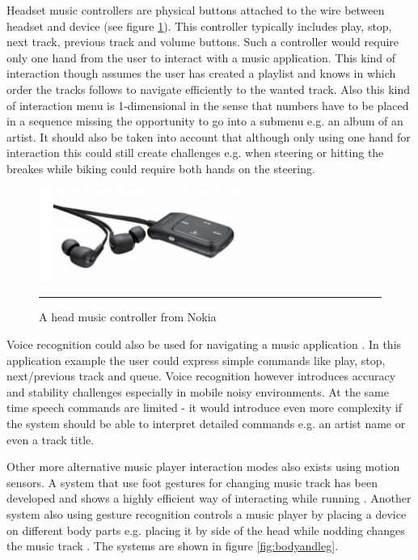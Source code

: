 Headset music controllers are physical buttons attached to the wire between headset and device (see figure \ref{fig:nokia}). This controller typically includes play, stop, next track, previous track and volume buttons. Such a controller would require only one hand from the user to interact with a music application. This kind of interaction though assumes the user has created a playlist and knows in which order the tracks follows to navigate efficiently to the wanted track. Also this kind of interaction menu is 1-dimensional in the sense that numbers have to be placed in a sequence missing the opportunity to go into a submenu e.g. an album of an artist. It should also be taken into account that although only using one hand for interaction this could still create challenges e.g. when steering or hitting the breakes while biking could require both hands on the steering.

\begin{figure}[htbp]
	\centering
		\includegraphics[width=0.6\textwidth,height=\textheight,keepaspectratio]{./Figures/nokia-headset.png}
		\rule{35em}{0.5pt}
	\caption[Nokia music headset]{A head music controller from Nokia \cite{nokia_launch:_2011}}
	\label{fig:nokia}
\end{figure}

Voice recognition could also be used for navigating a music application \cite{stewart_boling_voice_2013}. In this application example the user could express simple commands like play, stop, next/previous track and queue. Voice recognition however introduces accuracy and stability challenges especially in mobile noisy environments. At the same time speech commands are limited - it would introduce even more complexity if the system should be able to interpret detailed commands e.g. an artist name or even a track title.

Other more alternative music player interaction modes also exists using motion sensors. A system that use foot gestures for changing music track has been developed and shows a highly efficient way of interacting while running \cite{smus_running_2010}. Another system also using gesture recognition controls a music player by placing a device on different body parts e.g. placing it by side of the head while nodding changes the music track \cite{strachan_bodyspace_2007}. The systems are shown in figure \ref{fig:bodyandleg}.


